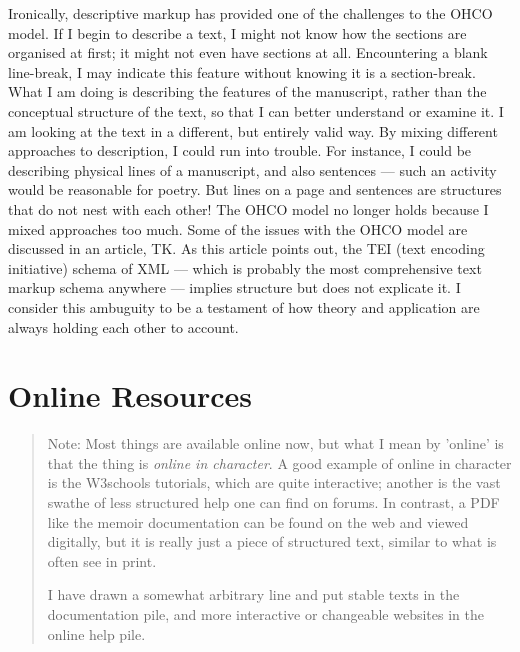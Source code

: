 \documentclass[12pt, oneside]{memoir}
\begin{document}
Ironically, descriptive markup has provided one of the challenges to the OHCO model. If I begin to describe a text, I might not know how the sections are organised at first; it might not even have sections at all. Encountering a blank line-break, I may indicate this feature without knowing it is a section-break. What I am doing is describing the features of the manuscript, rather than the conceptual structure of the text, so that I can better understand or examine it. I am looking at the text in a different, but entirely valid way. By mixing different approaches to description, I could run into trouble. For instance, I could be describing physical lines of a manuscript, and also sentences — such an activity would be reasonable for poetry. But lines on a page and sentences are structures that do not nest with each other! The OHCO model no longer holds because I mixed approaches too much. Some of the issues with the OHCO model are discussed in an article, TK. As this article points out, the TEI (text encoding initiative) schema of XML — which is probably the most comprehensive text markup schema anywhere — implies structure but does not explicate it. I consider this ambuguity to be a testament of how theory and application are always holding each other to account.

\chapter{Online Resources}

\begin{quotation}
    Note: Most things are available online now, but what I mean by 'online' is that the thing is \emph{online in character}. A good example of online in character is the W3schools tutorials, which are quite interactive; another is the vast swathe of less structured help one can find on forums. In contrast, a PDF like the memoir documentation can be found on the web and viewed digitally, but it is really just a piece of structured text, similar to what is often see in print.

I have drawn a somewhat arbitrary line and put stable texts in the documentation pile, and more interactive or changeable websites in the online help pile.
\end{quotation}
\end{document}
